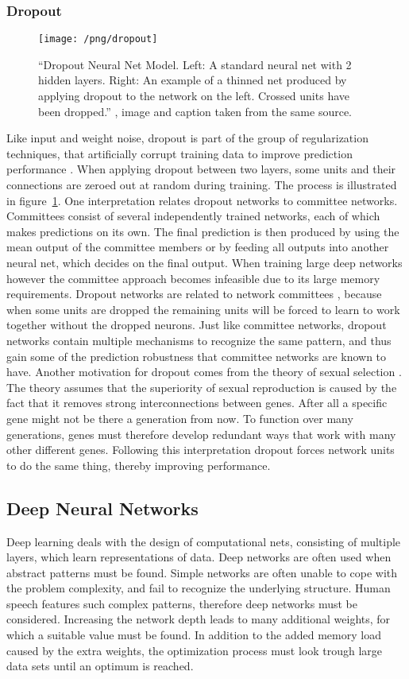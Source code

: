 \subsubsection{Dropout}
\begin{figure}
\texttt{[image: /png/dropout]}
\caption{\enquote{Dropout Neural Net Model. Left: A standard neural net with 2 hidden layers. Right: An example of a thinned net produced by applying dropout to the network on the left. Crossed units have been dropped.} \cite{Srivastava2014}, image and caption taken from the same source.}
\label{fig:Dropout}
\end{figure}
Like input and weight noise, dropout is part of the group of regularization techniques, that artificially corrupt training data to improve prediction performance \cite{Wager2013}. When applying dropout between two layers, some units and their connections are zeroed out at random during training. The process is illustrated in figure~\ref{fig:Dropout}.
One interpretation relates dropout networks to committee networks. Committees consist of several independently trained networks, each of which makes predictions on its own. The final prediction is then produced by using the mean output of the committee members or by feeding all outputs into another neural net, which decides on the final output.
When training large deep networks however the committee approach becomes infeasible due to its large memory requirements. Dropout networks are related to network committees \cite{Srivastava2014}, because when some units are dropped the remaining units will be forced to learn to work together without the dropped neurons. Just like committee networks, dropout networks contain multiple mechanisms to recognize the same pattern, and thus gain some of the prediction robustness that committee networks are known to have.
Another motivation for dropout comes from the theory of sexual selection \cite{Srivastava2014}. The theory assumes that the superiority of sexual reproduction is caused by the fact that it removes strong interconnections between genes. After all a specific gene might not be there a generation from now. To function over many generations, genes must therefore develop redundant ways that work with many other different genes.
Following this interpretation dropout forces network units to do the same thing, thereby improving performance.

\subsection{Deep Neural Networks}
Deep learning deals with the design of computational nets, consisting of multiple layers, which learn representations of data. Deep networks are often used when abstract
patterns must be found. Simple networks are often unable to cope with the problem complexity, and fail to recognize the underlying structure. Human speech features such complex patterns, therefore deep networks must be considered. Increasing the network depth leads to many additional weights, for which a suitable value must be found.
In addition to the added memory load caused by the extra weights, the optimization process must look trough large data sets until an optimum is reached.
